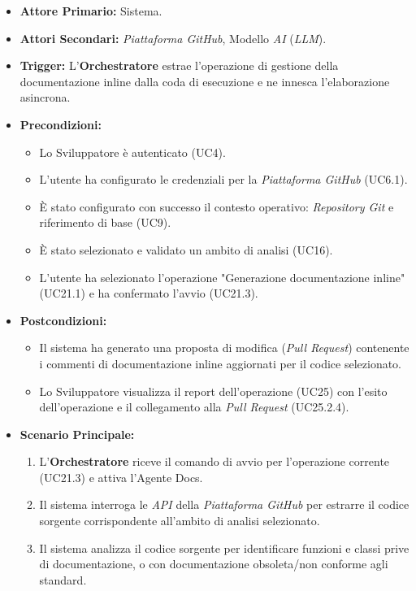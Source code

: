 \documentclass[12pt, a4paper]{article}
\begin{document}
\begin{itemize}
    \item \textbf{Attore Primario:} Sistema.
    \item \textbf{Attori Secondari:} \textit{Piattaforma GitHub}, Modello \textit{AI} (\textit{LLM}).
    \item \textbf{Trigger:} L'\textbf{Orchestratore} estrae l'operazione di gestione della documentazione inline dalla coda di esecuzione e ne innesca l'elaborazione asincrona.
    \item \textbf{Precondizioni:}
    \begin{itemize}
        \item Lo Sviluppatore è autenticato (UC4).
        \item L'utente ha configurato le credenziali per la \textit{Piattaforma GitHub} (UC6.1).
        \item È stato configurato con successo il contesto operativo: \textit{Repository Git} e riferimento di base (UC9).
        \item È stato selezionato e validato un ambito di analisi (UC16).
        \item L'utente ha selezionato l'operazione "Generazione documentazione inline" (UC21.1) e ha confermato l'avvio (UC21.3).
    \end{itemize}
    \item \textbf{Postcondizioni:}
    \begin{itemize}
        \item Il sistema ha generato una proposta di modifica (\textit{Pull Request}) contenente i commenti di documentazione inline aggiornati per il codice selezionato.
        \item Lo Sviluppatore visualizza il report dell'operazione (UC25) con l'esito dell'operazione e il collegamento alla \textit{Pull Request} (UC25.2.4).
    \end{itemize}
    \item \textbf{Scenario Principale:}
    \begin{enumerate}
        \item L'\textbf{Orchestratore} riceve il comando di avvio per l'operazione corrente (UC21.3) e attiva l'Agente Docs.
        \item Il sistema interroga le \textit{API} della \textit{Piattaforma GitHub} per estrarre il codice sorgente corrispondente all'ambito di analisi selezionato.
        \item Il sistema analizza il codice sorgente per identificare funzioni e classi prive di documentazione, o con documentazione obsoleta/non conforme agli standard.

\end{enumerate}
\end{itemize}
\end{document}

